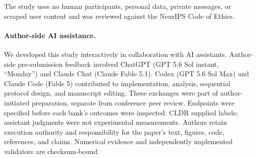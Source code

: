 \documentclass{article}
\begin{document}
The study uses no human participants, personal data, private messages, or
scraped user content and was reviewed against the NeurIPS Code of Ethics.

\paragraph{Author-side AI assistance.}
We developed this study interactively in collaboration with AI assistants.
Author-side pre-submission feedback involved ChatGPT (GPT 5.6 Sol instant,
``Monday'') and Claude Chat (Claude Fable 5.1). Codex (GPT 5.6 Sol Max) and
Claude Code (Fable 5) contributed to implementation, analysis, sequential
protocol design, and manuscript editing. These exchanges were part of
author-initiated preparation, separate from conference peer review. Endpoints were specified
before each bank's outcomes were inspected. CLDR supplied labels; assistant
judgments were not experimental measurements. Authors retain execution
authority and responsibility for the paper's text, figures, code, references,
and claims. Numerical evidence and independently implemented validators are
checksum-bound.

\clearpage

\end{document}
